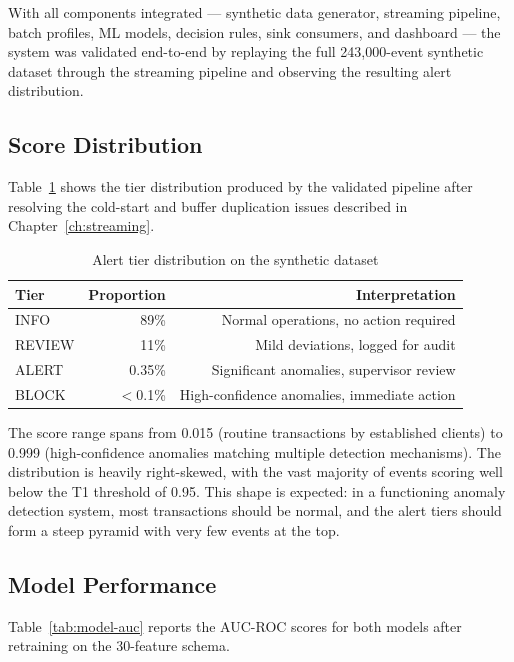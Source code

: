 With all components integrated --- synthetic data generator, streaming
pipeline, batch profiles, ML models, decision rules, sink consumers, and
dashboard --- the system was validated end-to-end by replaying the full
243,000-event synthetic dataset through the streaming pipeline and
observing the resulting alert distribution.

\subsection{Score Distribution}

Table~\ref{tab:tier-distribution} shows the tier distribution produced by
the validated pipeline after resolving the cold-start and buffer
duplication issues described in Chapter~\ref{ch:streaming}.

\begin{table}[H]
\centering
\caption{Alert tier distribution on the synthetic dataset}
\label{tab:tier-distribution}
\begin{tabular}{@{}lrr@{}}
\toprule
\textbf{Tier} & \textbf{Proportion} & \textbf{Interpretation} \\
\midrule
INFO   & 89\%   & Normal operations, no action required \\
REVIEW & 11\%   & Mild deviations, logged for audit \\
ALERT  & 0.35\% & Significant anomalies, supervisor review \\
BLOCK  & $<$0.1\% & High-confidence anomalies, immediate action \\
\bottomrule
\end{tabular}
\end{table}

The score range spans from 0.015 (routine transactions by established
clients) to 0.999 (high-confidence anomalies matching multiple detection
mechanisms). The distribution is heavily right-skewed, with the vast
majority of events scoring well below the T1 threshold of 0.95. This
shape is expected: in a functioning anomaly detection system, most
transactions should be normal, and the alert tiers should form a steep
pyramid with very few events at the top.

\subsection{Model Performance}

Table~\ref{tab:model-auc} reports the AUC-ROC scores for both models
after retraining on the 30-feature schema.

